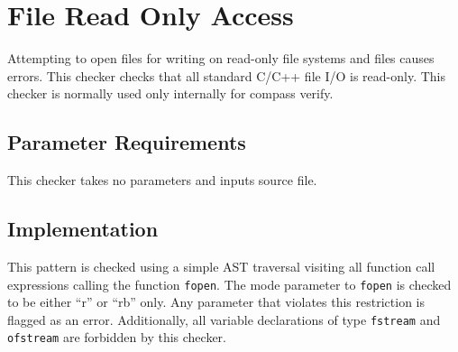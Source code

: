 %
%

\section{File Read Only Access}
\label{FileReadOnlyAccess::overview}
Attempting to open files for writing on read-only file systems and files causes errors. This checker checks that all standard C/C++ file I/O is read-only. This checker is normally used only internally for compass verify.

\subsection{Parameter Requirements}
This checker takes no parameters and inputs source file.

\subsection{Implementation}
This pattern is checked using a simple AST traversal visiting all function call expressions calling the function {\tt fopen}. The mode parameter to {\tt fopen} is checked to be either ``r'' or ``rb'' only. Any parameter that violates this restriction is flagged as an error. Additionally, all variable declarations of type {\tt fstream} and {\tt ofstream} are forbidden by this checker.

